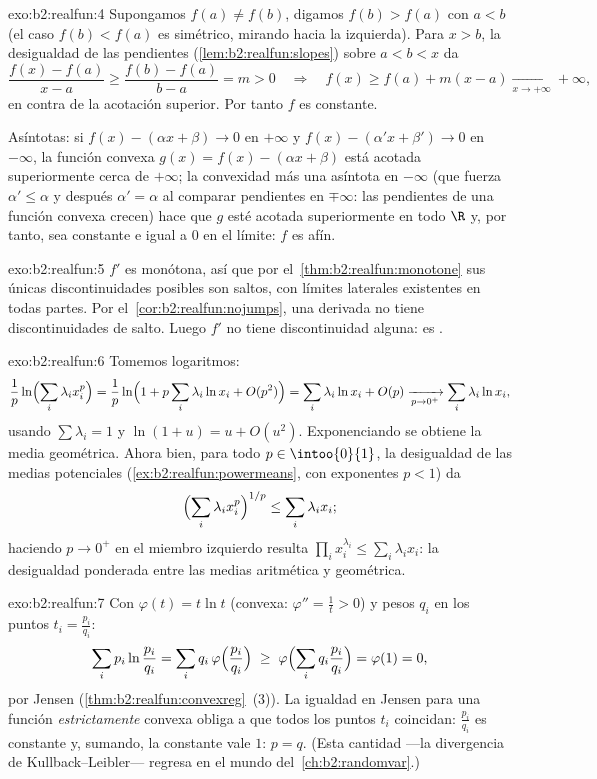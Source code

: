\begin{solution}{exo:b2:realfun:4}
Supongamos $f(a) \neq f(b)$, digamos $f(b) > f(a)$ con $a < b$ (el
caso $f(b) < f(a)$ es simétrico, mirando hacia la izquierda). Para
$x > b$, la desigualdad de las pendientes
(\cref{lem:b2:realfun:slopes}) sobre $a < b < x$ da
\[
\frac{f(x) - f(a)}{x - a} \geq \frac{f(b) - f(a)}{b - a} = m > 0
\quad\Longrightarrow\quad
f(x) \geq f(a) + m(x - a) \xrightarrow[x\to+\infty]{} +\infty,
\]
en contra de la acotación superior. Por tanto $f$ es constante.

Asíntotas: si $f(x) - (\alpha x + \beta) \to 0$ en $+\infty$ y $f(x)
- (\alpha' x + \beta') \to 0$ en $-\infty$, la función convexa $g(x)
= f(x) - (\alpha x + \beta)$ está acotada superiormente cerca de
$+\infty$; la convexidad más una asíntota en $-\infty$ (que fuerza
$\alpha' \leq \alpha$ y después $\alpha' = \alpha$ al comparar
pendientes en $\mp\infty$: las pendientes de una función convexa
crecen) hace que $g$ esté acotada superiormente en todo $\R$ y, por
tanto, sea constante e igual a $0$ en el límite: $f$ es afín.
\end{solution}

\begin{solution}{exo:b2:realfun:5}
$f'$ es monótona, así que por el~\cref{thm:b2:realfun:monotone} sus
únicas discontinuidades posibles son saltos, con límites laterales
existentes en todas partes. Por el~\cref{cor:b2:realfun:nojumps},
una derivada no tiene discontinuidades de salto. Luego $f'$ no tiene
discontinuidad alguna: es .
\end{solution}

\begin{solution}{exo:b2:realfun:6}
Tomemos logaritmos:
\[
\frac1p \ln\Bigl(\sum_i \lambda_i x_i^p\Bigr)
= \frac1p \ln\Bigl(1 + p\sum_i \lambda_i \ln x_i +
O(p^2)\Bigr)
= \sum_i \lambda_i \ln x_i + O(p)
\xrightarrow[p \to 0^+]{} \sum_i \lambda_i \ln x_i ,
\]
usando $\sum\lambda_i = 1$ y $\ln(1 + u) = u + O(u^2)$.
Exponenciando se obtiene la media geométrica. Ahora bien, para todo
$p \in \intoo{0}{1}$, la desigualdad de las medias potenciales
(\cref{ex:b2:realfun:powermeans}, con exponentes $p < 1$) da
\[
\Bigl(\sum_i \lambda_i x_i^p\Bigr)^{1/p} \leq \sum_i\lambda_i x_i ;
\]
haciendo $p \to 0^+$ en el miembro izquierdo resulta $\prod_i
x_i^{\lambda_i} \leq \sum_i \lambda_i x_i$: la desigualdad ponderada
entre las medias aritmética y geométrica.
\end{solution}

\begin{solution}{exo:b2:realfun:7}
Con $\varphi(t) = t\ln t$ (convexa: $\varphi'' = \frac1t > 0$) y
pesos $q_i$ en los puntos $t_i = \frac{p_i}{q_i}$:
\[
\sum_i p_i \ln\frac{p_i}{q_i}
= \sum_i q_i\, \varphi\Bigl(\frac{p_i}{q_i}\Bigr)
\;\geq\; \varphi\Bigl(\sum_i q_i \frac{p_i}{q_i}\Bigr)
= \varphi(1) = 0 ,
\]
por Jensen (\cref{thm:b2:realfun:convexreg}~(3)). La igualdad en
Jensen para una función \emph{estrictamente} convexa obliga a que
todos los puntos $t_i$ coincidan: $\frac{p_i}{q_i}$ es constante y,
sumando, la constante vale $1$: $p = q$. (Esta cantidad ---la
divergencia de Kullback--Leibler--- regresa en el mundo del~\cref{ch:b2:randomvar}.)
\end{solution}

